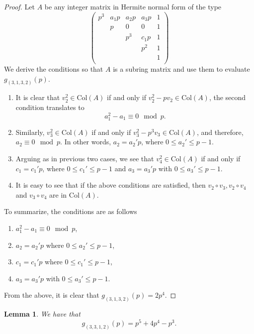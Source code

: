 \documentclass[a4paper]{amsart}
\newtheorem{lemma}[theorem]{Lemma}
\numberwithin{equation}{section}
\theoremstyle{remark}
\renewcommand{\Col}{\mathrm{Col}}
\begin{document}
\begin{proof}
    Let $A$ be any integer matrix in Hermite normal form of the type
    $$
    \begin{pmatrix}
        p^3 & a_1p & a_2p & a_3p & 1\\
         & p & 0 & 0 & 1\\
          & & p^3 & c_1p & 1\\
          &&& p^2 & 1\\
          &&&& 1\\
    \end{pmatrix}
    $$
    We derive the conditions so that $A$ is a subring matrix and use them to evaluate $g_{(3,1,3,2)}(p)$.
    \begin{enumerate}
        \item It is clear that $v_2^2 \in \Col(A)$ if and only if $v_2^2-pv_2 \in \Col(A)$, the second condition translates to
        \begin{equation}\label{(3,1,3,2)1}
            a_1^2-a_1 \equiv 0 \mod p.
        \end{equation}
        \item Similarly, $v_3^2 \in \Col(A)$ if and only if $v_3^2-p^3v_3 \in \Col(A)$, and therefore, $a_2 \equiv 0 \mod p$. In other words, $a_2 = a_2'p$, where $0 \leq a_2' \leq p-1$.
        \item Arguing as in previous two cases, we see that $v_4^2 \in \Col(A)$ if and only if $c_1 = c_1'p$, where $0 \leq c_1' \leq p-1$ and $a_3 = a_3'p$ with $0 \leq a_3' \leq p-1$.
        \item It is easy to see that if the above conditions are satisfied, then $v_2\circ v_3,v_2\circ v_4$ and $v_3\circ v_4$ are in $\Col(A)$.
    \end{enumerate}
    To summarize, the conditions are as follows
    \begin{enumerate}
        \item $a_1^2-a_1 \equiv 0 \mod p$,
        \item $a_2 = a_2'p$ where $0 \leq a_2' \leq p-1$,
        \item $c_1 = c_1'p$ where $0 \leq c_1' \leq p-1$, \item $a_3 = a_3'p$ with $0 \leq a_3' \leq p-1$.
    \end{enumerate}
    From the above, it is clear that $g_{(3,1,3,2)}(p) = 2p^4$.
\end{proof}
\begin{lemma}
    We have that
    \begin{equation}\label{(3,3,1,2)0}
        g_{(3,3,1,2)}(p)=p^5+4p^4-p^3.
    \end{equation}
\end{lemma}
\end{document}
